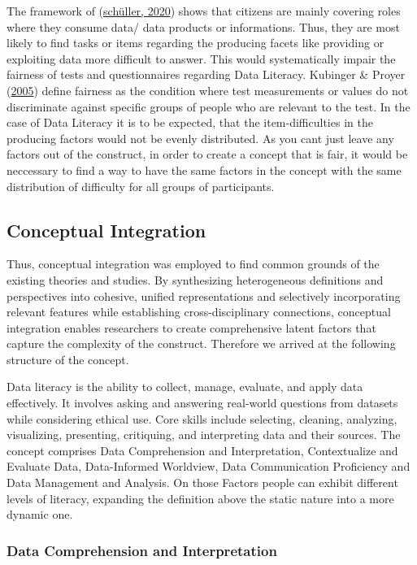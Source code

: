 \documentclass[
  12pt,
  a4paper,
  twoside]{article}
\begin{document}
The framework of (\protect\hyperlink{ref-schuxfcller2020}{schüller, 2020}) shows that citizens are mainly covering roles where they consume data/ data products or informations.
Thus, they are most likely to find tasks or items regarding the producing facets like providing or exploiting data more difficult to answer. This would systematically impair the fairness of tests and questionnaires regarding Data Literacy. Kubinger \& Proyer (\protect\hyperlink{ref-kubinger2005}{2005}) define fairness as the condition where test measurements or values do not discriminate against specific groups of people who are relevant to the test. In the case of Data Literacy it is to be expected, that the item-difficulties in the producing factors would not be evenly distributed. As you cant just leave any factors out of the construct, in order to create a concept that is fair, it would be neccessary to find a way to have the same factors in the concept with the same distribution of difficulty for all groups of participants.

\hypertarget{conceptual-integration}{%
\subsection{Conceptual Integration}\label{conceptual-integration}}

Thus, conceptual integration was employed to find common grounds of the existing theories and studies.
By synthesizing heterogeneous definitions and perspectives into cohesive, unified representations and selectively incorporating relevant features while establishing cross-disciplinary connections, conceptual integration enables researchers to create comprehensive latent factors that capture the complexity of the construct.
Therefore we arrived at the following structure of the concept.

Data literacy is the ability to collect, manage, evaluate, and apply data effectively. It involves asking and answering real-world questions from datasets while considering ethical use. Core skills include selecting, cleaning, analyzing, visualizing, presenting, critiquing, and interpreting data and their sources.
The concept comprises Data Comprehension and Interpretation, Contextualize and Evaluate Data, Data-Informed Worldview, Data Communication Proficiency and Data Management and Analysis. On those Factors people can exhibit different levels of literacy, expanding the definition above the static nature into a more dynamic one.

\hypertarget{data-comprehension-and-interpretation}{%
\subsubsection{Data Comprehension and Interpretation}\label{data-comprehension-and-interpretation}}
\end{document}

